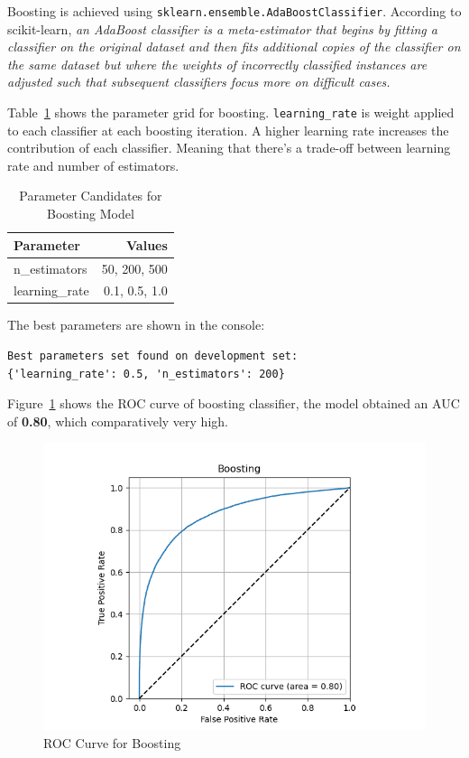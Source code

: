 Boosting is achieved using \texttt{sklearn.ensemble.AdaBoostClassifier}. According to scikit-learn,\textit{ an AdaBoost classifier is a meta-estimator that begins by fitting a classifier on the original dataset and then fits additional copies of the classifier on the same dataset but where the weights of incorrectly classified instances are adjusted such that subsequent classifiers focus more on difficult cases.}

Table~\ref{tab:parameters-boosting} shows the parameter grid for boosting. \texttt{learning\_rate} is weight applied to each classifier at each boosting iteration. A higher learning rate increases the contribution of each classifier. Meaning that there's a trade-off between learning rate and number of estimators.

\begin{table}[h]
\centering
\begin{tabular}{|l|r|}
\hline
\textbf{Parameter}    & \textbf{Values}          \\ \hline
n\_estimators         & 50, 200, 500             \\ \hline
learning\_rate        & 0.1, 0.5, 1.0            \\ \hline
\end{tabular}
\caption{Parameter Candidates for Boosting Model}
\label{tab:parameters-boosting}
\end{table}

The best parameters are shown in the console:

\begin{verbatim}
Best parameters set found on development set:
{'learning_rate': 0.5, 'n_estimators': 200}
\end{verbatim}

Figure~\ref{fig:roc-boosting} shows the ROC curve of boosting classifier, the model obtained an AUC of \textbf{0.80}, which comparatively very high.

\begin{figure}
    \centering
    \includegraphics[width=1\linewidth]{docs//assets/individual_roc_curve_Boosting.png}
    \caption{ROC Curve for Boosting}
    \label{fig:roc-boosting}
\end{figure}

